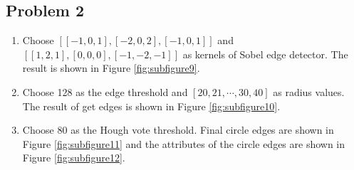 \documentclass[bwprint]{gmcmthesis}
\numberwithin{figure}{section}
\begin{document}
\subsection{Problem 2}
\begin{enumerate}[label=\alph*.]
    \item Choose $[[-1, 0, 1], [-2, 0, 2], [-1, 0, 1]]$ and $[[1, 2, 1], [0, 0, 0], [-1, -2, -1]]$ as kernels of Sobel edge detector. The result is shown in Figure \ref{fig:subfigure9}.
    \item Choose 128 as the edge threshold and $[20, 21, \cdots, 30, 40]$ as radius values. The result of get edges is shown in Figure \ref{fig:subfigure10}.
    \item Choose 80 as the Hough vote threshold. Final circle edges are shown in Figure \ref{fig:subfigure11} and the attributes of the circle edges are shown in Figure \ref{fig:subfigure12}.
\end{enumerate}
\end{document}
